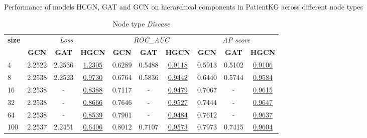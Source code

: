 \begin{table} 
    \centering
    \caption{Performance of models HCGN, GAT and GCN on hierarchical components in PatientKG across different node types}
    \label{tab:tabHypPerf}  
    \begin{subtable}[t]{\textwidth}
        \centering
        \begin{tabular}{l|ccc|ccc|ccc}        
            \toprule
            \multirow{2}{*}{\textbf{size}} & \multicolumn{3}{c|}{\textit{Loss}} & \multicolumn{3}{c|}{\textit{ROC\_AUC}} & \multicolumn{3}{c}{\textit{AP score}} \\
            & \textbf{GCN} & \textbf{GAT} & \textbf{HGCN} & \textbf{GCN} & \textbf{GAT} & \textbf{HGCN} & \textbf{GCN} & \textbf{GAT} & \textbf{HGCN} \\
            \midrule
                4 & 2.2522 & 2.2536 & \underline{1.2305} & 0.6289 & 0.5488 & \underline{0.9118} & 0.5913 & 0.5102 & \underline{0.9106} \\  
                8 & 2.2538 & 2.2523 & \underline{0.9730} & 0.6764 & 0.5836 & \underline{0.9442} & 0.6440 & 0.5744 & \underline{0.9584} \\
                16 & 2.2538 & - & \underline{0.8388} & 0.7117 & - & \underline{0.9479} & 0.7067 & - & \underline{0.9615} \\
                32 & 2.2538 & - & \underline{0.8666} & 0.7646 & - & \underline{0.9527} & 0.7444 & - & \underline{0.9647} \\
                64 & 2.2538 & - & \underline{0.8539} & 0.7901 & - & \underline{0.9484} & 0.7612 & - & \underline{0.9637} \\
                100 & 2.2537 & 2.2451 & \underline{0.6406} & 0.8012 & 0.7107 & \underline{0.9573} & 0.7973 & 0.7415 & \underline{0.9604} \\
            \bottomrule
        \end{tabular}
        \caption{Node type \textit{Disease}}
    \end{subtable}
    
    \vspace{1em}
    

\end{table}
